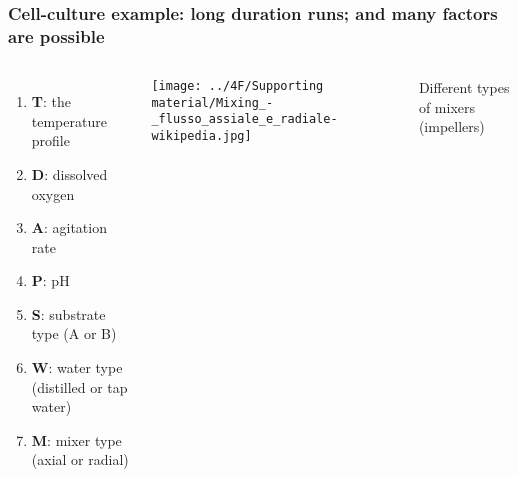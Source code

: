 \documentclass[11pt,aspectratio=169,mathserif]{beamer}
\begin{document}
\begin{frame}\frametitle{Cell-culture example: long duration runs; and many factors are possible}
	\begin{columns}[c]
			\begin{enumerate}
				\item	\textbf{T}: the temperature profile
				\item	\textbf{D}: dissolved oxygen
				\item	\textbf{A}: agitation rate
				\item	\textbf{P}: pH
				\item	\textbf{S}: substrate type (A or B)
				\item	\textbf{W}: water type (distilled or tap water)
				\item	\textbf{M}: mixer type (axial or radial)
		
			\end{enumerate}
		
			
			
			\vspace{0.2cm}
			
			\centerline{\texttt{[image: ../4F/Supporting material/Mixing\_-\_flusso\_assiale\_e\_radiale-wikipedia.jpg]}}
			
			{\color{blue} \small Different types of mixers (impellers)} 
	\end{columns}
\end{frame}
\end{document}
